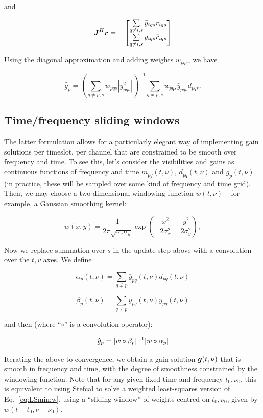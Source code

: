 \documentclass[useAMS,usenatbib]{mn2e}
\newcommand{\mat}[1]{{\bmath{#1}}}
\newcommand{\JJ}{\mat{J}} %
\begin{document}
and 

\begin{equation}
\label{eq:JHR:DI:tf}
\JJ^H\bmath{r} 
= -\Matrix{c}{
\sum\limits_{q\ne i,s} \bar{y}_{iqs} r_{iqs}   \\
\sum\limits_{q\ne i,s} y_{iqs} \bar{r}_{iqs}  
}
\end{equation}

Using the diagonal approximation and adding weights $w_{pqs}$, we have

\begin{equation}
\label{eq:JHJ:diag:W:tf}
\hat{g}_p = \left( \sum\limits_{q\ne p,s} w_{pqs} |y^2_{pqs}| \right )^{-1} \sum\limits_{q\ne p,s} w_{pqs} \bar{y}_{pqs} d_{pqs}.
\end{equation}


\subsection{Time/frequency sliding windows}
\label{sec:DI:smooth}

The latter formulation allows for a particularly elegant way of implementing gain solutions per timeslot, per channel
that are constrained to be smooth over frequency and time. To see this, let's consider the visibilities and gains as
continuous functions of frequency and time $m_{pq}(t,\nu)$, $d_{pq}(t,\nu)$ and $g_p(t,\nu)$ (in practice, these will be sampled over some kind of frequency and time grid). Then, we may choose a two-dimensional windowing function $w(t,\nu)$ -- for example, 
a Gaussian smoothing kernel:

\[
w(x,y) = \frac{1}{2\pi\sqrt{\sigma_x\sigma_y}} \exp\left( -\frac{x^2}{2\sigma^2_x} - \frac{y^2}{2\sigma_y^2} \right),
\]

Now we replace summation over $s$ in the update step above with a convolution over the $t,v$ axes. We define

\[
\alpha_p(t,\nu) = \sum\limits_{q\ne p} \bar{y}_{pq}(t,\nu) d_{pq}(t,\nu)
\]

\[
\beta_p(t,\nu) = \sum\limits_{q\ne p} \bar{y}_{pq}(t,\nu) y_{pq}(t,\nu)
\]

and then (where ``$\circ$'' is a convolution operator):

\begin{equation}
\label{eq:JHJ:diag:smooth}
\hat{g}_p = [ w\circ\beta_p ]^{-1} [ w\circ \alpha_p ]\\
\end{equation}

Iterating the above to convergence, we obtain a gain solution $\bmath{g}(t,\nu)$ that is smooth in frequency and time, with the degree of smoothness 
constrained by the windowing function. Note that for any given fixed time and frequency $t_0,\nu_0$, this is equivalent to using Stefcal to solve a weighted least-squares version of Eq.~\ref{eq:LSmin:w}, using a ``sliding window'' of weights centred on $t_0,\nu_0$, given by $w(t-t_0,\nu-\nu_0)$.
\end{document}
